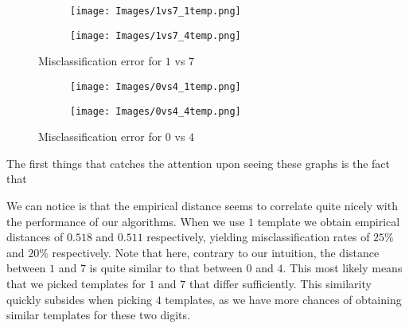 \documentclass{article}
\theoremstyle{definition}
\theoremstyle{remark}
\theoremstyle{proposition}
\begin{document}
            \begin{figure}[H]
                \centering
                \begin{subfigure}{.5\textwidth}
                      \centering
                      \texttt{[image: Images/1vs7\_1temp.png]}
                \end{subfigure}%
                \begin{subfigure}{.5\textwidth}
                      \centering
                      \texttt{[image: Images/1vs7\_4temp.png]}
                \end{subfigure}
                \caption{Misclassification error for $1$ vs $7$}
            \end{figure}
            \begin{figure}[H]
                \centering
                \begin{subfigure}{.5\textwidth}
                      \centering
                      \texttt{[image: Images/0vs4\_1temp.png]}
                \end{subfigure}%
                \begin{subfigure}{.5\textwidth}
                      \centering
                      \texttt{[image: Images/0vs4\_4temp.png]}
                \end{subfigure}
                \caption{Misclassification error for $0$ vs $4$}
            \end{figure}

            The first things that catches the attention upon seeing these graphs is the fact that

            We can notice is that the empirical distance seems to correlate quite nicely with the performance of our algorithms. When we use $1$ template we obtain empirical distances of $0.518$ and $0.511$ respectively, yielding misclassification rates of $25\%$ and $20\%$ respectively. Note that here, contrary to our intuition, the distance between $1$ and $7$ is quite similar to that between $0$ and $4$. This most likely means that we picked templates for $1$ and $7$ that differ sufficiently. This similarity quickly subsides when picking $4$ templates, as we have more chances of obtaining similar templates for these two digits.
            
\end{document}
